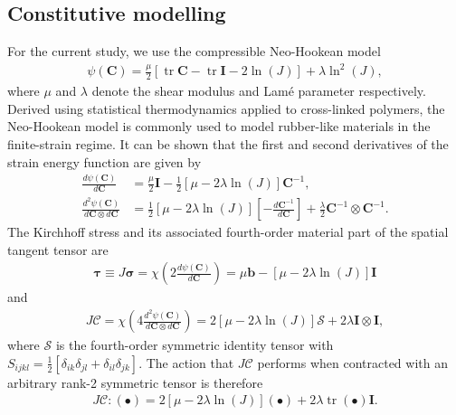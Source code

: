 \documentclass[AMA,STIX1COL]{WileyNJD-v2}
\DeclareMathOperator{\trace}{tr}
\begin{document}
\subsection{Constitutive modelling
\label{sec: Constitutive modelling}
}

For the current study, we use the compressible Neo-Hookean model
\begin{gather}
\psi \left( \mathbf{C} \right)
  = \frac{\mu}{2} \left[ \trace{\mathbf{C}} - \trace{\mathbf{I}} - 2 \ln\left( J \right) \right]
  + \lambda \ln^{2}\left( J \right) ,
\label{eq:neo_hookean_energy}
\end{gather}
where $\mu$ and $\lambda$ denote the shear modulus and Lam\'{e} parameter respectively.
Derived using statistical thermodynamics applied to cross-linked polymers, the Neo-Hookean model \cite{Treloar1975a,Treloar1976a} is commonly used to model rubber-like materials in the finite-strain regime.
It can be shown that the first and second derivatives of the strain energy function are given by
\begin{align}
\frac{d \psi \left( \mathbf{C} \right)}{d \mathbf{C}}
  &= \frac{\mu}{2} \mathbf{I} - \frac{1}{2} \left[ \mu - 2\lambda\ln\left( J \right) \right] \mathbf{C}^{-1} ,\\
\frac{d^{2} \psi \left( \mathbf{C} \right)}{d \mathbf{C} \otimes d \mathbf{C}}
  &= \frac{1}{2}\left[ \mu - 2\lambda\ln\left( J \right) \right] \left[ - \frac{d \mathbf{C}^{-1}}{d \mathbf{C}} \right]
  + \frac{\lambda}{2} \mathbf{C}^{-1} \otimes \mathbf{C}^{-1} .
\end{align}
The Kirchhoff stress and its associated fourth-order material part of the spatial tangent tensor are
\begin{gather}
\boldsymbol{\tau}
  \equiv J \boldsymbol{\sigma}
  = \chi\left( 2 \frac{d \psi \left( \mathbf{C} \right)}{d \mathbf{C}} \right)
  = \mu \mathbf{b} - \left[ \mu - 2\lambda\ln\left( J \right) \right] \mathbf{I}
\end{gather}
and
\begin{gather}
J \boldsymbol{\mathcal{C}}
  = \chi\left( 4 \frac{d^{2} \psi \left( \mathbf{C} \right)}{d \mathbf{C} \otimes d \mathbf{C}} \right)
  = 2 \left[ \mu - 2\lambda\ln\left( J \right) \right] \boldsymbol{\mathcal{S}}
  + 2 \lambda \mathbf{I} \otimes \mathbf{I} ,
\end{gather}
where $\boldsymbol{\mathcal{S}}$ is the fourth-order symmetric identity tensor
with $S_{ijkl}=\frac{1}{2}\left[\delta_{ik}\delta_{jl}+\delta_{il}\delta_{jk}\right]$.
The action that $J \boldsymbol{\mathcal{C}}$ performs when contracted with an arbitrary rank-2 symmetric tensor is therefore
\begin{gather}
J \boldsymbol{\mathcal{C}} : \left( \bullet \right)
  = 2 \left[ \mu - 2\lambda\ln\left( J \right) \right] \left( \bullet \right)
  + 2 \lambda \trace\left( \bullet \right) \mathbf{I}.
\label{eq:simplified_action}
\end{gather}
\end{document}
